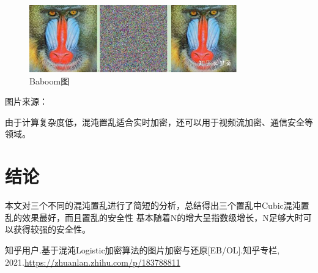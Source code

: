 \documentclass[a4paper]{article}
\begin{document}
\begin{figure}[H]
  \centering
  \includegraphics[width=0.8\textwidth]{imgs/baboom.jpg}
  \caption{Baboom图}
  \label{Baboom}
\end{figure}
图片来源：\cite{ref1}

由于计算复杂度低，混沌置乱适合实时加密，还可以用于视频流加密、通信安全等领域。

\clearpage
\section{结论}

本文对三个不同的混沌置乱进行了简短的分析，总结得出三个置乱中Cubic混沌置乱的效果最好，而且置乱的安全性
基本随着N的增大呈指数级增长，N足够大时可以获得较强的安全性。

\clearpage
\begin{thebibliography}{99}
     知乎用户.基于混沌Logistic加密算法的图片加密与还原[EB/OL].知乎专栏, 2021.\url{https://zhuanlan.zhihu.com/p/183788811}
\end{thebibliography}
\end{document}
